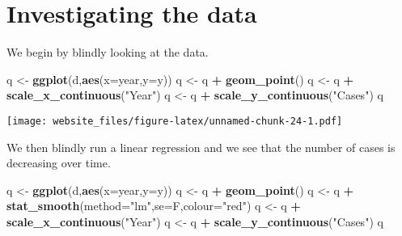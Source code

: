 \documentclass[]{book}
\newenvironment{Shaded}{\begin{snugshade}}{\end{snugshade}}
\newcommand{\KeywordTok}[1]{\textcolor[rgb]{0.13,0.29,0.53}{\textbf{#1}}}
\newcommand{\DataTypeTok}[1]{\textcolor[rgb]{0.13,0.29,0.53}{#1}}
\newcommand{\StringTok}[1]{\textcolor[rgb]{0.31,0.60,0.02}{#1}}
\newcommand{\OperatorTok}[1]{\textcolor[rgb]{0.81,0.36,0.00}{\textbf{#1}}}
\newcommand{\NormalTok}[1]{#1}
\begin{document}
\begin{Shaded}
\begin{Highlighting}[]
{{{\NormalTok{d <-}\StringTok{ }\KeywordTok{na.omit}\NormalTok{(d)}
\end{Highlighting}
\end{Shaded}

\newpage

\section{Investigating the data}\label{investigating-the-data}

We begin by blindly looking at the data.

\begin{Shaded}
\begin{Highlighting}[]
\NormalTok{q <-}\StringTok{ }\KeywordTok{ggplot}\NormalTok{(d,}\KeywordTok{aes}\NormalTok{(}\DataTypeTok{x=}\NormalTok{year,}\DataTypeTok{y=}\NormalTok{y))}
\NormalTok{q <-}\StringTok{ }\NormalTok{q }\OperatorTok{+}\StringTok{ }\KeywordTok{geom_point}\NormalTok{()}
\NormalTok{q <-}\StringTok{ }\NormalTok{q }\OperatorTok{+}\StringTok{ }\KeywordTok{scale_x_continuous}\NormalTok{(}\StringTok{"Year"}\NormalTok{)}
\NormalTok{q <-}\StringTok{ }\NormalTok{q }\OperatorTok{+}\StringTok{ }\KeywordTok{scale_y_continuous}\NormalTok{(}\StringTok{"Cases"}\NormalTok{)}
\NormalTok{q}
\end{Highlighting}
\end{Shaded}

\texttt{[image: website\_files/figure-latex/unnamed-chunk-24-1.pdf]}

We then blindly run a linear regression and we see that the number of
cases is decreasing over time.

\begin{Shaded}
\begin{Highlighting}[]
\NormalTok{q <-}\StringTok{ }\KeywordTok{ggplot}\NormalTok{(d,}\KeywordTok{aes}\NormalTok{(}\DataTypeTok{x=}\NormalTok{year,}\DataTypeTok{y=}\NormalTok{y))}
\NormalTok{q <-}\StringTok{ }\NormalTok{q }\OperatorTok{+}\StringTok{ }\KeywordTok{geom_point}\NormalTok{()}
\NormalTok{q <-}\StringTok{ }\NormalTok{q }\OperatorTok{+}\StringTok{ }\KeywordTok{stat_smooth}\NormalTok{(}\DataTypeTok{method=}\StringTok{"lm"}\NormalTok{,}\DataTypeTok{se=}\NormalTok{F,}\DataTypeTok{colour=}\StringTok{"red"}\NormalTok{)}
\NormalTok{q <-}\StringTok{ }\NormalTok{q }\OperatorTok{+}\StringTok{ }\KeywordTok{scale_x_continuous}\NormalTok{(}\StringTok{"Year"}\NormalTok{)}
\NormalTok{q <-}\StringTok{ }\NormalTok{q }\OperatorTok{+}\StringTok{ }\KeywordTok{scale_y_continuous}\NormalTok{(}\StringTok{"Cases"}\NormalTok{)}
\NormalTok{q}
\end{Highlighting}
\end{Shaded}
\end{document}
